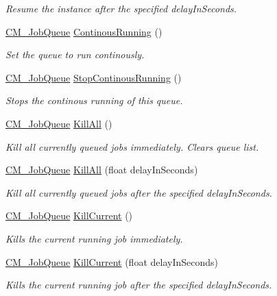 \begin{DoxyCompactItemize}
\begin{DoxyCompactList}\small\item\em Resume the instance after the specified delay\+In\+Seconds. \end{DoxyCompactList}\item 
\hyperlink{class_c_m___job_queue}{C\+M\+\_\+\+Job\+Queue} \hyperlink{class_c_m___job_queue_a8b0a472fcdce0ddba4576bfe39feb7ff}{Continous\+Running} ()
\begin{DoxyCompactList}\small\item\em Set the queue to run continously. \end{DoxyCompactList}\item 
\hyperlink{class_c_m___job_queue}{C\+M\+\_\+\+Job\+Queue} \hyperlink{class_c_m___job_queue_a636825476d970cc13724f73ae9e288ee}{Stop\+Continous\+Running} ()
\begin{DoxyCompactList}\small\item\em Stops the continous running of this queue. \end{DoxyCompactList}\item 
\hyperlink{class_c_m___job_queue}{C\+M\+\_\+\+Job\+Queue} \hyperlink{class_c_m___job_queue_a194f2954b520d2984ff313d3c675dce2}{Kill\+All} ()
\begin{DoxyCompactList}\small\item\em Kill all currently queued jobs immediately. Clears queue list. \end{DoxyCompactList}\item 
\hyperlink{class_c_m___job_queue}{C\+M\+\_\+\+Job\+Queue} \hyperlink{class_c_m___job_queue_adce8edbf35e9f320611f789262d215c6}{Kill\+All} (float delay\+In\+Seconds)
\begin{DoxyCompactList}\small\item\em Kill all currently queued jobs after the specified delay\+In\+Seconds. \end{DoxyCompactList}\item 
\hyperlink{class_c_m___job_queue}{C\+M\+\_\+\+Job\+Queue} \hyperlink{class_c_m___job_queue_aeb73327ca071773270823880e4ce9f31}{Kill\+Current} ()
\begin{DoxyCompactList}\small\item\em Kills the current running job immediately. \end{DoxyCompactList}\item 
\hyperlink{class_c_m___job_queue}{C\+M\+\_\+\+Job\+Queue} \hyperlink{class_c_m___job_queue_ac3cb68f5d7fb1f63d95cf8ac8eff0172}{Kill\+Current} (float delay\+In\+Seconds)
\begin{DoxyCompactList}\small\item\em Kills the current running job after the specified delay\+In\+Seconds. \end{DoxyCompactList}\item 

\end{DoxyCompactItemize}
